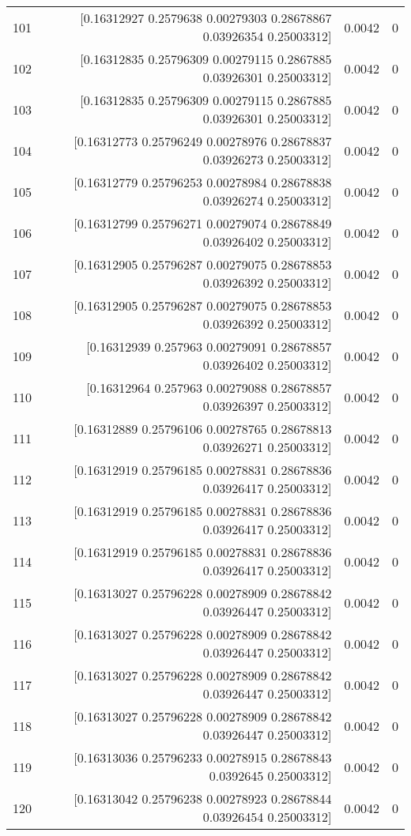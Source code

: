 \begin{longtable}{lrrr}
101 & [0.16312927 0.2579638  0.00279303 0.28678867 0.03926354 0.25003312] & 0.0042 & 0 \\
102 & [0.16312835 0.25796309 0.00279115 0.2867885  0.03926301 0.25003312] & 0.0042 & 0 \\
103 & [0.16312835 0.25796309 0.00279115 0.2867885  0.03926301 0.25003312] & 0.0042 & 0 \\
104 & [0.16312773 0.25796249 0.00278976 0.28678837 0.03926273 0.25003312] & 0.0042 & 0 \\
105 & [0.16312779 0.25796253 0.00278984 0.28678838 0.03926274 0.25003312] & 0.0042 & 0 \\
106 & [0.16312799 0.25796271 0.00279074 0.28678849 0.03926402 0.25003312] & 0.0042 & 0 \\
107 & [0.16312905 0.25796287 0.00279075 0.28678853 0.03926392 0.25003312] & 0.0042 & 0 \\
108 & [0.16312905 0.25796287 0.00279075 0.28678853 0.03926392 0.25003312] & 0.0042 & 0 \\
109 & [0.16312939 0.257963   0.00279091 0.28678857 0.03926402 0.25003312] & 0.0042 & 0 \\
110 & [0.16312964 0.257963   0.00279088 0.28678857 0.03926397 0.25003312] & 0.0042 & 0 \\
111 & [0.16312889 0.25796106 0.00278765 0.28678813 0.03926271 0.25003312] & 0.0042 & 0 \\
112 & [0.16312919 0.25796185 0.00278831 0.28678836 0.03926417 0.25003312] & 0.0042 & 0 \\
113 & [0.16312919 0.25796185 0.00278831 0.28678836 0.03926417 0.25003312] & 0.0042 & 0 \\
114 & [0.16312919 0.25796185 0.00278831 0.28678836 0.03926417 0.25003312] & 0.0042 & 0 \\
115 & [0.16313027 0.25796228 0.00278909 0.28678842 0.03926447 0.25003312] & 0.0042 & 0 \\
116 & [0.16313027 0.25796228 0.00278909 0.28678842 0.03926447 0.25003312] & 0.0042 & 0 \\
117 & [0.16313027 0.25796228 0.00278909 0.28678842 0.03926447 0.25003312] & 0.0042 & 0 \\
118 & [0.16313027 0.25796228 0.00278909 0.28678842 0.03926447 0.25003312] & 0.0042 & 0 \\
119 & [0.16313036 0.25796233 0.00278915 0.28678843 0.0392645  0.25003312] & 0.0042 & 0 \\
120 & [0.16313042 0.25796238 0.00278923 0.28678844 0.03926454 0.25003312] & 0.0042 & 0 \\

\end{longtable}
